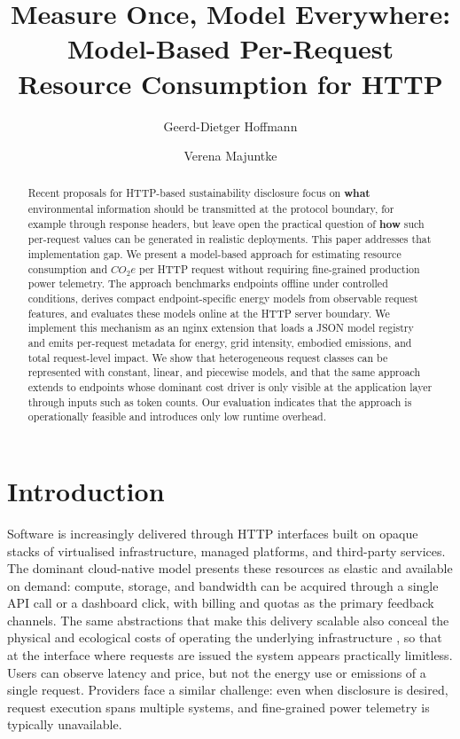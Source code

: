 \documentclass[sigconf]{acmart}
\title{Measure Once, Model Everywhere:\\ Model-Based Per-Request Resource Consumption for HTTP}
\author{Geerd-Dietger Hoffmann}
\affiliation{
  \institution{Green Coding Solutions,\\ {\small University of Potsdam, HTW Berlin}}
  \city{Potsdam}
  \country{Germany}
}
\author{Verena Majuntke}
\affiliation{
  \institution{HTW Berlin}
  \city{Berlin}
  \country{Germany}}
\begin{document}
\begin{abstract}
Recent proposals for HTTP-based sustainability disclosure focus on \textbf{what} environmental information should be transmitted at the protocol boundary, for example through response headers, but leave open the practical question of \textbf{how} such per-request values can be generated in realistic deployments. This paper addresses that implementation gap. We present a model-based approach for estimating resource consumption and $CO_2e$ per HTTP request without requiring fine-grained production power telemetry. The approach benchmarks endpoints offline under controlled conditions, derives compact endpoint-specific energy models from observable request features, and evaluates these models online at the HTTP server boundary. We implement this mechanism as an nginx extension that loads a JSON model registry and emits per-request metadata for energy, grid intensity, embodied emissions, and total request-level impact. We show that heterogeneous request classes can be represented with constant, linear, and piecewise models, and that the same approach extends to endpoints whose dominant cost driver is only visible at the application layer through inputs such as token counts. Our evaluation indicates that the approach is operationally feasible and introduces only low runtime overhead.
\end{abstract}
\maketitle

\section{Introduction}

Software is increasingly delivered through HTTP interfaces built on opaque
stacks of virtualised infrastructure, managed platforms, and third-party
services. The dominant cloud-native model presents these resources as
elastic and available on demand: compute, storage, and bandwidth can be
acquired through a single API call or a dashboard click, with billing and
quotas as the primary feedback channels. The same abstractions that make
this delivery scalable also conceal the physical and ecological costs of
operating the underlying infrastructure
\cite{mytton2020hiding,parssinen2018onlineadvertising,han2025fairco2}, so
that at the interface where requests are issued the system appears
practically limitless. Users can observe latency and price, but not the
energy use or emissions of a single request. Providers face a similar
challenge: even when disclosure is desired, request execution spans
multiple systems, and fine-grained power telemetry is typically
unavailable.
\end{document}
